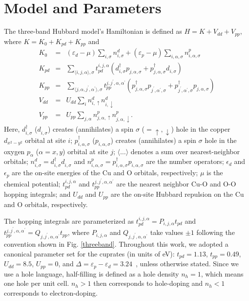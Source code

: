 \documentclass[reprint,nofootinbib,nobibnotes,amsmath,amssymb,aps,prb,floatfix]{revtex4-2}
\newcommand{\pdag}{{\phantom\dagger}}
\newcommand{\V}{{\mathcal V}}
\newcommand{\figdisp}[1]{Fig. \ref{#1}}
\begin{document}
\section{Model and Parameters}

The three-band Hubbard model's Hamiltonian is defined 
as $H=K+V_{dd}+V_{pp}$, where $K=K_0+K_{pd}+K_{pp}$ and 
\begin{eqnarray}\nonumber
K_0&=&(\varepsilon_d-\mu)\sum_{i,\sigma}n_{i,\sigma}^d+ (\varepsilon_p-\mu)\sum_{i,\alpha,\sigma} n^p_{i,\alpha,\sigma} \\\nonumber
K_{pd}&=&\sum_{\langle  i,j,\alpha\rangle,\sigma}t^{i,j,\alpha}_{pd}(d^\dagger_{i,\sigma}p^\pdag_{j,\alpha,\sigma}+p^\dagger_{j,\alpha,\sigma}d^\pdag_{i,\sigma})
\\\nonumber
K_{pp}&=&\sum_{\langle j,\alpha,j^\prime,\alpha^\prime \rangle,\sigma} t^{j,j^\prime,\alpha,\alpha^\prime}_{pp}(p^\dagger_{j,\alpha,\sigma}p^\pdag_{j^\prime,\alpha^\prime,\sigma}+p^\dagger_{j^\prime,\alpha^\prime,\sigma}p^\pdag_{j,\alpha,\sigma})
\\\nonumber V_{dd}&=&U_{dd} \sum_i n^d_{i,\uparrow}n^d_{i,\downarrow}
\\V_{pp}&=&U_{pp} \sum_{j,\alpha} n^p_{j,\alpha,\uparrow}n^p_{j,\alpha,\downarrow}.
\end{eqnarray}
Here, $d^\dagger_{i,\sigma}$ ($d^\pdag_{i,\sigma}$) creates (annihilates) a spin $\sigma$ ($=\uparrow,\downarrow$) hole in the copper $d_{x^2-y^2}$ orbital at site $i$;  $p^\dagger_{i,\alpha,\sigma}$ ($p^\pdag_{i,\alpha,\sigma}$) creates (annihilates) a spin  $\sigma$ hole in the oxygen $p_\alpha$ ($\alpha = x,y$) orbital at site $j$; $\langle \dots \rangle$ denotes a sum over nearest-neighbor orbitals; $n^d_{i,\sigma}=d^\dagger_{i,\sigma}d^\pdag_{i,\sigma}$ and 
$n^p_{i,\alpha,\sigma}=p^\dagger_{i,\alpha,\sigma}p^\pdag_{i,\alpha,\sigma}$ are the number operators; 
$\epsilon_d$ and $\epsilon_p$ are the on-site energies of the Cu and O orbitals, respectively; $\mu$ is the chemical potential; $t^{i,j,\alpha}_{pd}$ and $t^{j,j^\prime,\alpha,\alpha^\prime}_{pp}$ are the nearest neighbor Cu-O and O-O hopping integrals; and $U_{dd}$ and $U_{pp}$ are the on-site Hubbard repulsion on the Cu and O orbitals, respectively. 

The hopping integrals are parameterized as $t^{i,j,\alpha}_{pd} = P_{i,j,\alpha}t_{pd}$ and $t^{j,j^\prime,\alpha,\alpha^\prime}_{pp} =  Q_{j,j^\prime,\alpha,\alpha^\prime} t_{pp}$, where $P_{i,j,\alpha}$ and $Q_{j,j^\prime,\alpha,\alpha^\prime}$ take values $\pm 1$ following the convention shown in \figdisp{threeband}. Throughout this work, we adopted a canonical parameter set for the cuprates (in units of eV): $t_{pd} = 1.13$, $t_{pp} = 0.49$, $U_{dd} = 8.5$, $U_{pp} = 0$, and $\Delta = \varepsilon_p -\varepsilon_d = 3.24$~\cite{Kung, Czyzyk, Johnston, Ohta}, unless otherwise stated. Since we use a hole language,  half-filling is defined as a hole density $n_h =1$, which means one hole per unit cell. $n_h>1$ then corresponds to hole-doping and $n_h<1$ corresponds to electron-doping.
\end{document}
